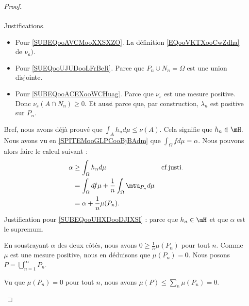 \begin{proof}
\begin{subproof}
\begin{subproof}
\begin{subequations}
\begin{align}
				\end{align}
			\end{subequations}
			Justifications.
			\begin{itemize}
				\item
				      Pour \eqref{SUBEQooAVCMooXXSXZO}. La définition \eqref{EQooVKTXooCwZdha} de \( \nu_a)\).
				\item
				      Pour \eqref{SUEQooUJUDooLFrBcR}. Parce que \( P_n\cup N_n=\Omega\) est une union disjointe.
				\item
				      Pour \eqref{SUBEQooACEXooWCHuag}. Parce que \( \nu_s\) est une mesure positive. Donc \( \nu_s(A\cap N_n)\geq 0\). Et aussi parce que, par construction, \( \lambda_n\) est positive sur \( P_n\).
			\end{itemize}
			Bref, nous avons déjà prouvé que \( \int_Ah_nd\mu\leq \nu(A)\). Cela signifie que \( h_n\in \mH\).
			\spitem[\( \mu(P_n)=0\)]
			Nous avons vu en \ref{SPITEMooGLPCooBjBAdm} que \( \int_{\Omega}fd\mu=\alpha\). Nous pouvons alors faire le calcul suivant :
			\begin{subequations}
				\begin{align}
					\alpha & \geq \int_{\Omega}h_nd\mu                                    & \text{cf.justi.}	\label{SUBEQooUHXDooDJIXSI} \\
					       & = \int_{\Omega}df\mu+\frac{1}{ n}\int_{\Omega}\mtu_{P_n}d\mu                                               \\
					       & =\alpha+\frac{1}{ n}\mu(P_n).
				\end{align}
			\end{subequations}
			Justification pour \eqref{SUBEQooUHXDooDJIXSI} : parce que \( h_n\in\mH\) et que \( \alpha\) est le supremum.

			En soustrayant \( \alpha\) des deux côtés, nous avons \( 0\geq \frac{1}{ n}\mu(P_n)\) pour tout \( n\). Comme \( \mu\) est une mesure positive, nous en déduisons que \( \mu(P_n)=0\).
			\spitem[Définition de \( P\)]
			Nous posons \( P=\bigcup_{n=1}^{\infty}P_n\).

			\spitem[\( \mu(P)=0\)]
			Vu que \( \mu(P_n)=0\) pour tout \( n\), nous avons \( \mu(P)\leq \sum_n\mu(P_n)=0\).

			\spitem[\( \nu_s(\Omega\setminus P)=0\)]


\end{subproof}
\end{subproof}
\end{proof}
